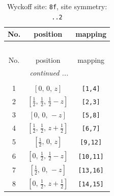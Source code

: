 \documentclass[fleqn,8pt]{jsarticle}
\begin{document}
\begin{longtable}{ccc}
\caption{Wyckoff site: {\tt 8f}, site symmetry: {\tt ..2}}
 \\
 \hline \hline
No. & position & mapping \\ \hline \endfirsthead

\multicolumn{2}{l}{\tablename\ \thetable{}} \\
 \hline \hline
No. & position & mapping \\ \hline \endhead

 \hline \hline
\multicolumn{2}{r}{\footnotesize\it continued ...} \\ \endfoot

 \hline \hline
\multicolumn{2}{r}{} \\ \endlastfoot

1 & $\left[ 0,\, 0,\, z \right]$ & {\tt [1,4]} \\ \hline
2 & $\left[ \frac{1}{2},\, \frac{1}{2},\, \frac{1}{2} - z \right]$ & {\tt [2,3]} \\ \hline
3 & $\left[ 0,\, 0,\, - z \right]$ & {\tt [5,8]} \\ \hline
4 & $\left[ \frac{1}{2},\, \frac{1}{2},\, z + \frac{1}{2} \right]$ & {\tt [6,7]} \\ \hline
5 & $\left[ \frac{1}{2},\, 0,\, z \right]$ & {\tt [9,12]} \\ \hline
6 & $\left[ 0,\, \frac{1}{2},\, \frac{1}{2} - z \right]$ & {\tt [10,11]} \\ \hline
7 & $\left[ \frac{1}{2},\, 0,\, - z \right]$ & {\tt [13,16]} \\ \hline
8 & $\left[ 0,\, \frac{1}{2},\, z + \frac{1}{2} \right]$ & {\tt [14,15]} \\
\end{longtable}
\renewcommand{\arraystretch}{1.2}
\end{document}
